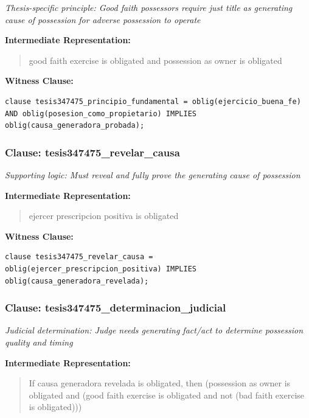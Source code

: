 \documentclass[11pt,a4paper]{article}
\begin{document}
\textit{Thesis-specific principle: Good faith possessors require just title as generating cause of possession for adverse possession to operate}

\textbf{Intermediate Representation:}

\begin{quote}
good faith exercise is obligated and possession as owner is obligated
\end{quote}

\textbf{Witness Clause:}

\begin{lstlisting}[style=witnessstyle, language=Witness]
clause tesis347475_principio_fundamental = oblig(ejercicio_buena_fe) AND oblig(posesion_como_propietario) IMPLIES oblig(causa_generadora_probada);
\end{lstlisting}

\subsubsection{Clause: tesis347475\_revelar\_causa}

\textit{Supporting logic: Must reveal and fully prove the generating cause of possession}

\textbf{Intermediate Representation:}

\begin{quote}
ejercer prescripcion positiva is obligated
\end{quote}

\textbf{Witness Clause:}

\begin{lstlisting}[style=witnessstyle, language=Witness]
clause tesis347475_revelar_causa = oblig(ejercer_prescripcion_positiva) IMPLIES oblig(causa_generadora_revelada);
\end{lstlisting}

\subsubsection{Clause: tesis347475\_determinacion\_judicial}

\textit{Judicial determination: Judge needs generating fact/act to determine possession quality and timing}

\textbf{Intermediate Representation:}

\begin{quote}
If causa generadora revelada is obligated, then (possession as owner is obligated and (good faith exercise is obligated and not (bad faith exercise is obligated)))
\end{quote}
\end{document}
